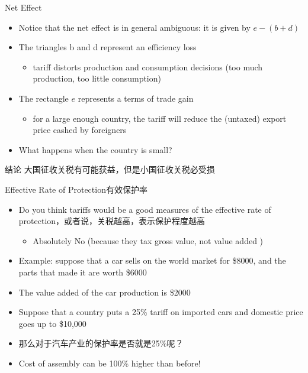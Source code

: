 \documentclass[10pt,hyperref={CJKbookmarks=true},xcolor=dvipsnames,aspectratio=169]{beamer}
\begin{document}
\begin{frame}{Net Effect}

\begin{itemize}
\item Notice that the net effect is in general ambiguous: it is given by
$e-(b+d)$
\item The triangles b and d represent an efficiency loss 

\begin{itemize}
\item tariff distorts production and consumption decisions (too much production,
too little consumption) 
\end{itemize}
\item The rectangle $e$ represents a terms of trade gain 

\begin{itemize}
\item for a large enough country, the tariff will reduce the (untaxed) export
price cashed by foreigners 
\end{itemize}
\item What happens when the country is small?
\end{itemize}
	\pause
	\begin{block}{结论}
		大国征收关税有可能获益，但是小国征收关税必受损
	\end{block}
\end{frame}

\begin{frame}{Effective Rate of Protection有效保护率}

\begin{itemize}
\item Do you think tariffs would be a good measures of the effective rate
of protection，或者说，关税越高，表示保护程度越高

\begin{itemize}
\item Absolutely No (because they tax gross value, not value added )
\end{itemize}
\item Example: suppose that a car sells on the world market for \$8000,
and the parts that made it are worth \$6000 
\item The value added of the car production is \$2000 
\item Suppose that a country puts a 25\% tariff on imported cars and domestic
price goes up to \$10,000 
\item 那么对于汽车产业的保护率是否就是25\%呢？
\item Cost of assembly can be 100\% higher than before!\end{itemize}


\end{frame}
\end{document}

